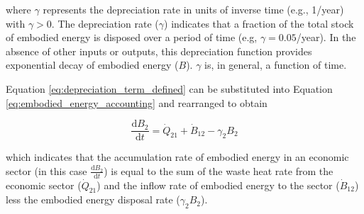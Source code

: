 \noindent where $\gamma$ represents the depreciation rate in units of inverse time (e.g., 1/year) with $\gamma > 0$. The depreciation rate ($\gamma$) indicates that a fraction of the total stock of embodied energy is disposed over a period of time (e.g, $\gamma = 0.05$/year). In the absence of other inputs or outputs, this depreciation function provides exponential decay of embodied energy ($B$). $\gamma$ is, in general, a function of time.

Equation \ref{eq:depreciation_term_defined} can be substituted into Equation \ref{eq:embodied_energy_accounting} and rearranged to obtain 

\begin{equation} \label{eq:dB2/dt_single_sector_with_depreciation_gamma}
	\frac{\mathrm{d}B_{2}}{\mathrm{d}t} =  \dot{Q}_{21} + \dot{B}_{12} - \gamma_{2}B_{2}
\end{equation}

\noindent which indicates that the accumulation rate of embodied energy in an economic sector (in this case $\frac{\mathrm{d}B_{2}}{\mathrm{d}t}$) is equal to the sum of the waste heat rate from the economic sector ($\dot{Q}_{21}$) and the inflow rate of embodied energy to the sector ($\dot{B}_{12}$) less the embodied energy disposal rate ($\gamma_{2}B_{2}$).








%
%

